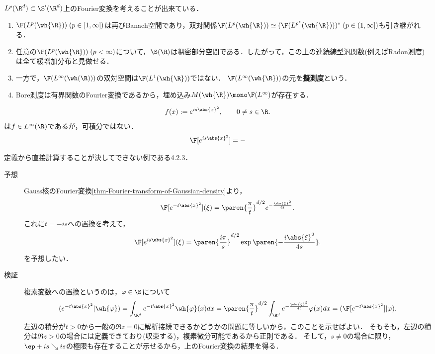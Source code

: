 \documentclass[uplatex,dvipdfmx]{jsreport}
\begin{document}
\begin{definition}
    $L^p(\R^d)\subset\S'(\R^d)$上のFourier変換を考えることが出来ている．
    \begin{enumerate}
        \item $\F(L^p(\wh{\R}))\;(p\in[1,\infty])$は再びBanach空間であり，双対関係$\F(L^p(\wh{\R}))\simeq(\F(L^{p^*}(\wh{\R})))^*\;{(p\in(1,\infty])}$も引き継がれる．
        \item 任意の$\F(L^p(\wh{\R}))\;(p<\infty)$について，$\S(\R)$は稠密部分空間である．したがって，この上の連続線型汎関数(例えばRadon測度)は全て緩増加分布と見做せる．
        \item 一方で，$\F(L^\infty(\wh(\R)))$の双対空間は$\F(L^1(\wh{\R}))$ではない．
        $\F(L^\infty(\wh{\R}))$の元を\textbf{擬測度}という．
        \item Bore測度は有界関数のFourier変換であるから，埋め込み$M(\wh{\R})\mono\F(L^\infty)$が存在する．
    \end{enumerate}
\end{definition}

\begin{example}
    \[f(x):=e^{is\abs{x}^2},\qquad 0\ne s\in\R.\]
    は$f\in L^\infty(\R)$であるが，可積分ではない．
    \[\F[e^{is\abs{x}^2}]=-\]
\end{example}
\begin{Proof}
    定義から直接計算することが決してできない例である\cite{Strichartz03-Distribution}4.2.3．
    \begin{description}
        \item[予想] Gauss核のFourier変換\ref{thm-Fourier-transform-of-Gaussian-density}より，
        \[\F[e^{-t\abs{x}^2}](\xi)=\paren{\frac{\pi}{t}}^{d/2}e^{-\frac{\abs{\xi}^2}{4t}}.\]
        これに$t=-is$への置換を考えて，
        \[\F[e^{is\abs{x}^2}](\xi)=\paren{\frac{i\pi}{s}}^{d/2}\exp\paren{-\frac{i\abs{\xi}^2}{4s}}.\]
        を予想したい．
        \item[検証] 複素変数への置換というのは，$\varphi\in\S$について
        \[(e^{-t\abs{x}^2}|\wh{\varphi})=\int_{\R^d}e^{-t\abs{x}^2}\wh{\varphi}(x)dx=\paren{\frac{\pi}{t}}^{d/2}\int_{\R^d}e^{-\frac{\abs{\xi}^2}{4t}}\varphi(x)dx=(\F[e^{-t\abs{x}^2}]|\varphi).\]
        左辺の積分が$t>0$から一般の$\Re z=0$に解析接続できるかどうかの問題に等しいから，このことを示せばよい．
        そもそも，左辺の積分は$\Re z>0$の場合には定義できており(収束する)，複素微分可能であるから正則である．
        そして，$s\ne0$の場合に限り，$\ep+is\searrow is$の極限も存在することが示せるから，上のFourier変換の結果を得る．
    \end{description}
\end{Proof}
\end{document}
